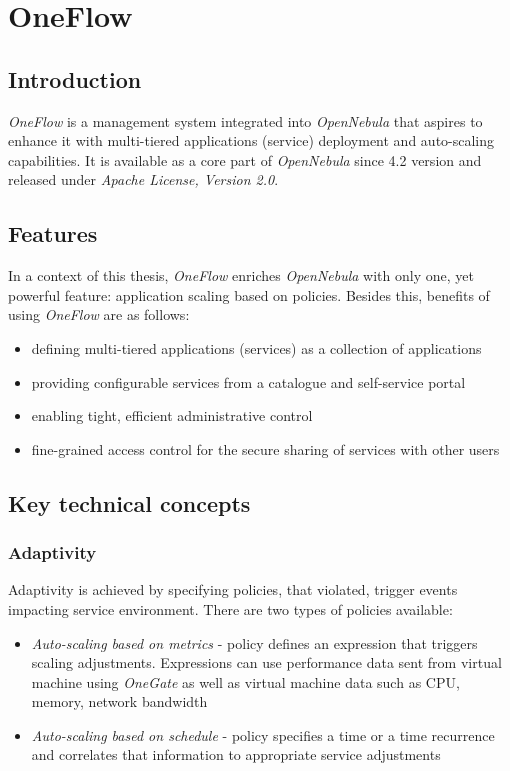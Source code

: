 \section{OneFlow}

\subsection{Introduction}
\emph{OneFlow} \cite{OneFlow} is a management system integrated into \emph{OpenNebula} that aspires to enhance it with multi-tiered applications (service) deployment and auto-scaling capabilities. It is available as a core part of \emph{OpenNebula} since 4.2 version and released under \emph{Apache License, Version 2.0}. 

\subsection{Features}
In a context of this thesis, \emph{OneFlow} enriches \emph{OpenNebula} with only one, yet powerful feature: application scaling based on policies. Besides this, benefits of using \emph{OneFlow} are as follows:
\begin{itemize}
\item defining multi-tiered applications (services) as a collection of applications
\item providing configurable services from a catalogue and self-service portal
\item enabling tight, efficient administrative control
\item fine-grained access control for the secure sharing of services with other users
\end{itemize}

\subsection{Key technical concepts}
\subsubsection{Adaptivity}
Adaptivity is achieved by specifying policies, that violated, trigger events impacting service environment. There are two types of policies available:
\begin{itemize}
 \item \emph{Auto-scaling based on metrics} - policy defines an expression that triggers scaling adjustments. Expressions can use performance data sent from virtual machine using \emph{OneGate} as well as virtual machine data such as CPU, memory, network bandwidth
 \item \emph{Auto-scaling based on schedule} - policy specifies a time or a time recurrence and correlates that information to appropriate service adjustments
\end{itemize}

